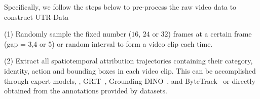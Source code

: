 \begin{table}[h]
\centering                         %
\renewcommand{\arraystretch}{1.4}  %
\caption{\textbf{Training Data Statistics.} We first build our UTR-Data mainly based on sampled HowTo100M, MeViS, and LaMOT. Then we mix UTR-Data with several existing video conversation data, \ie, LLaVA-NeXT-SFT and VideoChat2.}
\setlength{\tabcolsep}{1.5mm}      %
\label{tab:train_data}
\end{table}

Specifically, we follow the steps below to pre-process the raw video data to construct UTR-Data

\noindent (1) Randomly sample the fixed number ($16$, $24$ or $32$) frames at a certain frame (gap = 3,4 or 5) or random interval to form a video clip each time.

\noindent (2) Extract all spatiotemporal attribution trajectories containing their category, identity, action and bounding boxes in each video clip. This can be accomplished through expert models, \eg, GRiT~\citep{wu2022grit}, Grounding DINO~\citep{liu2023grounding}, and ByteTrack~\citep{zhang2022bytetrack} or directly obtained from the annotations provided by datasets.

